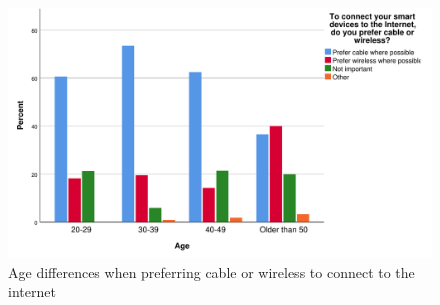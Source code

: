 \begin{figure}[!h]
    \centering
    \includegraphics[scale=0.55]{figures/diagrams/age_cable-wireless.pdf}
    \caption{Age differences when preferring cable or wireless to connect to the internet}
    \label{fig:age_cable-wireless}
\end{figure}

